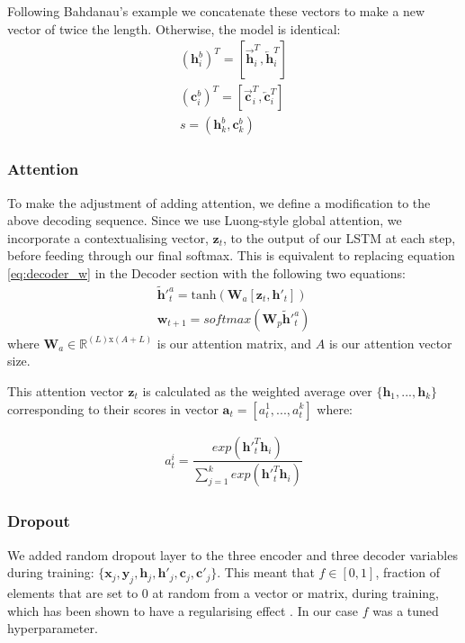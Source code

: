 Following Bahdanau's example \cite{bahdanau_neural_2014} we concatenate these vectors to make a new vector of twice the length. Otherwise, the model is identical:
\begin{align}
(\textbf{h}^b_i)^T = [\overrightarrow{\textbf{h}}^T_i,\overleftarrow{\textbf{h}}^T_i ] \\
(\textbf{c}^b_i)^T = [\overrightarrow{\textbf{c}}^T_i,\overleftarrow{\textbf{c}}^T_i ] \\
s = (\textbf{h}^b_k, \textbf{c}^b_k)
\end{align}

\subsubsection{Attention}

To make the adjustment of adding attention, we define a modification to the above decoding sequence. Since we use Luong-style\cite{luong_effective_2015} global attention, we incorporate a contextualising vector, $\textbf{z}_t$, to the output of our LSTM at each step, before feeding through our final softmax. This is equivalent to replacing equation \ref{eq:decoder_w} in the Decoder section with the following two equations:
\begin{align}
    \tilde{\textbf{h}}'^a_t =  \text{tanh}(\textbf{W}_a[\textbf{z}_t, \textbf{h}'_t])\\
    \textbf{w}_{t+1} = softmax(\textbf{W}_p\tilde{\textbf{h}}'^a_t) \label{eq:s2syw}  
\end{align}
where $\textbf{W}_a \in \mathbb{R}^{(L)\text{x}(A+L)} $ is our attention matrix, and 
$A$ is our attention vector size.

This attention vector $\textbf{z}_t$ is calculated as the weighted average over  $\{\textbf{h}_1,...,\textbf{h}_k\}$ corresponding to their scores in vector $\textbf{a}_t = [a_t^1,...,a_t^k]$ where:

\begin{align}
    a_t^i = \dfrac{exp(\mathbf{h}'^{T}_t\mathbf{h}_i)}{\sum_{j=1}^kexp(\mathbf{h}'^{T}_t\mathbf{h}_i)} 
\end{align}

\subsubsection{Dropout}

We added random dropout layer to the three encoder and three decoder variables during training:
$\{\textbf{x}_j, \textbf{y}_j, \textbf{h}_j, \textbf{h}'_j, \textbf{c}_j, \textbf{c}'_j\}$.  This meant that $f \in [0,1]$, fraction of elements that are set to 0 at random from a vector or matrix, during training, which has been shown to have a regularising effect  \cite{srivastava_dropout_nodate}. In our case $f$ was a tuned hyperparameter. 


